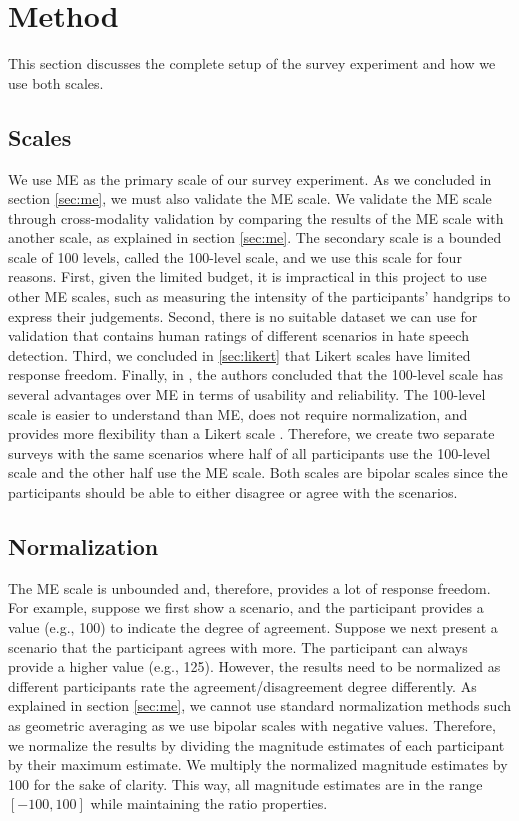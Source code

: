 \section{Method}
\label{sec:survey-method}
This section discusses the complete setup of the survey experiment and how we use both scales.

\subsection{Scales}
We use ME as the primary scale of our survey experiment.
%
As we concluded in section \ref{sec:me}, we must also validate the ME scale.
%
We validate the ME scale through cross-modality validation by comparing the results of the ME scale with another scale, as explained in section \ref{sec:me}.
%
The secondary scale is a bounded scale of 100 levels, called the 100-level scale, and we use this scale for four reasons.
%
First, given the limited budget, it is impractical in this project to use other ME scales, such as measuring the intensity of the participants' handgrips to express their judgements.
%
Second, there is no suitable dataset we can use for validation that contains human ratings of different scenarios in hate speech detection.
%
Third, we concluded in \ref{sec:likert} that Likert scales have limited response freedom.
%
Finally, in \citet{roitero2018fine}, the authors concluded that the 100-level scale has several advantages over ME in terms of usability and reliability.
%
The 100-level scale is easier to understand than ME, does not require normalization, and provides more flexibility than a Likert scale \citep{roitero2018fine}.
%
Therefore, we create two separate surveys with the same scenarios where half of all participants use the 100-level scale and the other half use the ME scale.
%
Both scales are bipolar scales since the participants should be able to either disagree or agree with the scenarios.

\subsection{Normalization}
The ME scale is unbounded and, therefore, provides a lot of response freedom.
%
For example, suppose we first show a scenario, and the participant provides a value (e.g., 100) to indicate the degree of agreement.
%
Suppose we next present a scenario that the participant agrees with more.
%
The participant can always provide a higher value (e.g., 125).
%
However, the results need to be normalized as different participants rate the agreement/disagreement degree differently.
%
As explained in section \ref{sec:me}, we cannot use standard normalization methods such as geometric averaging as we use bipolar scales with negative values.
%
Therefore, we normalize the results by dividing the magnitude estimates of each participant by their maximum estimate.
%
We multiply the normalized magnitude estimates by 100 for the sake of clarity.
%
This way, all magnitude estimates are in the range $[-100, 100]$ while maintaining the ratio properties.

